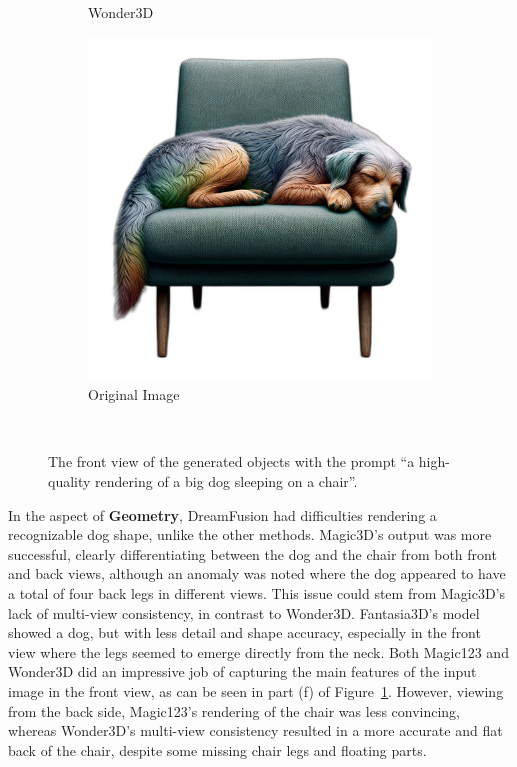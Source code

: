 \begin{figure}[ht]
\begin{subfigure}[b]{0.27\textwidth}
        \caption{Wonder3D}
        \vspace{0.1cm}
    \end{subfigure}
    \begin{subfigure}[b]{0.28\textwidth}
        \centering
        \includegraphics[width=\textwidth]{etc/Images/dog.png}
        \caption{Original Image}
        \vspace{0.1cm}
    \end{subfigure}
    \caption{The front view of the generated objects with the prompt ``a high-quality rendering of a big dog sleeping on a chair''.}~\label{fig:resultDogFront}
\end{figure}

In the aspect of \textbf{Geometry}, DreamFusion had difficulties rendering a recognizable dog shape, unlike the other methods. Magic3D's output was more successful, clearly differentiating between the dog and the chair from both front and back views, although an anomaly was noted where the dog appeared to have a total of four back legs in different views. This issue could stem from Magic3D's lack of multi-view consistency, in contrast to Wonder3D. Fantasia3D's model showed a dog, but with less detail and shape accuracy, especially in the front view where the legs seemed to emerge directly from the neck. Both Magic123 and Wonder3D did an impressive job of capturing the main features of the input image in the front view, as can be seen in part (f) of Figure~\ref{fig:resultDogFront}. However, viewing from the back side, Magic123's rendering of the chair was less convincing, whereas Wonder3D's multi-view consistency resulted in a more accurate and flat back of the chair, despite some missing chair legs and floating parts.\\

